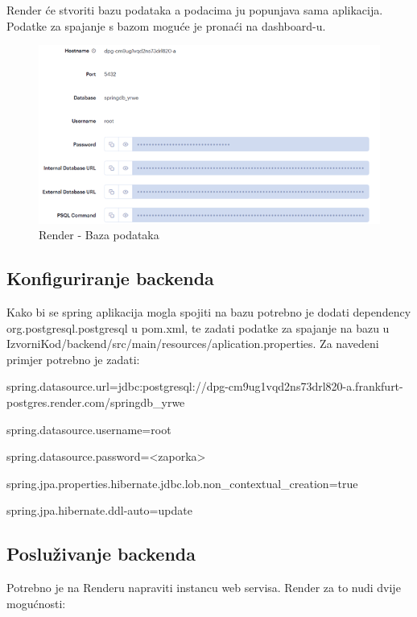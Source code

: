 Render će stvoriti bazu podataka a podacima ju popunjava sama aplikacija. 
Podatke za spajanje s bazom moguće je pronaći na dashboard-u.

\begin{figure}[H]
	\includegraphics[scale=0.4]{slike/render_db1.png}
	\centering
	\caption{Render - Baza podataka}
	\label{fig:render_db2}
\end{figure}

\subsection{Konfiguriranje backenda}

Kako bi se spring aplikacija mogla spojiti na bazu potrebno je dodati 
dependency org.postgresql.postgresql u pom.xml, te zadati podatke za spajanje 
na bazu u IzvorniKod/backend/src/main/resources/aplication.properties. Za 
navedeni primjer potrebno je zadati:

spring.datasource.url=jdbc:postgresql://dpg-cm9ug1vqd2ns73drl820-a.frankfurt-postgres.render.com/springdb_yrwe

spring.datasource.username=root

spring.datasource.password=<zaporka>

spring.jpa.properties.hibernate.jdbc.lob.non_contextual_creation=true

spring.jpa.hibernate.ddl-auto=update

\subsection{Posluživanje backenda}

Potrebno je na Renderu napraviti instancu web servisa. Render za to nudi dvije 
mogućnosti:

